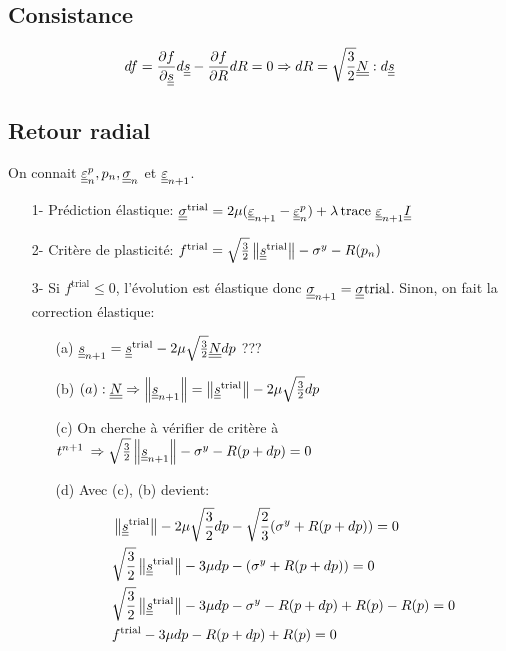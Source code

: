 \documentclass[11pt]{article}
\begin{document}
\subsection{Consistance}

\begin{equation}
  \label{eq:2}
  df = \frac{\partial f}{\partial {\underline{\underline{s}}}} d{\underline{\underline{s}}} - \frac{\partial f}{\partial R}dR = 0 \Rightarrow dR = \sqrt{\frac{3}{2}}{\underline{\underline{N}}}:d{\underline{\underline{s}}}
\end{equation}


\subsection{Retour radial}

On connait ${\underline{\underline{\varepsilon}}}^p_{n},p_n,{\underline{\underline{\sigma}}}_n$ et ${\underline{\underline{\varepsilon}}}_{n+1}$.
\begin{itemize}
\item[1-] Prédiction élastique: ${\underline{\underline{\sigma}}}^{\text{trial}}=2\mu ({\underline{\underline{\varepsilon}}}_{n+1}-{\underline{\underline{\varepsilon}}}^p_{n}) + \lambda \operatorname{trace \,}{{\underline{\underline{\varepsilon}}}_{n+1}}{\underline{\underline{I}}} $
\item[2-] Critère de plasticité: $f^{\text{trial}} = \sqrt{\frac{3}{2}}\left\Vert{\underline{\underline{s}}}^{\text{trial}}\right\Vert - \sigma^y - R(p_n)$
\item[3-] Si $f^{\text{trial}}\leq 0$, l'évolution est élastique donc ${\underline{\underline{\sigma}}}_{n+1}={\underline{\underline{\sigma}}}{\text{trial}}$. Sinon, on fait la correction élastique:
  \begin{itemize}
  \item[(a)] ${\underline{\underline{s}}}_{n+1}={\underline{\underline{s}}}^{\text{trial}} - 2\mu \sqrt{\frac{3}{2}} {\underline{\underline{N}}} dp$ ???
  \item[(b)] $(a):{\underline{\underline{N}}} \Rightarrow \left\Vert{\underline{\underline{s}}}_{n+1}\right\Vert=\left\Vert{\underline{\underline{s}}}^{\text{trial}}\right\Vert - 2\mu \sqrt{\frac{3}{2}} dp$ 
  \item[(c)] On cherche à vérifier de critère à $t^{n+1} \: \Rightarrow \sqrt{\frac{3}{2}}\left\Vert{\underline{\underline{s}}}_{n+1}\right\Vert - \sigma^y -R(p+dp) = 0 $
  \item[(d)] Avec (c), (b) devient:
    \begin{align}
      & \norm{\tens{s}^{\text{trial}}} - 2\mu \sqrt{\frac{3}{2}} dp - \sqrt{\frac{2}{3}}(\sigma^y  + R(p+dp)) =0 \\
      & \sqrt{\frac{3}{2}} \norm{\tens{s}^{\text{trial}}} - 3\mu  dp - (\sigma^y  + R(p+dp)) =0 \\
      & \sqrt{\frac{3}{2}} \norm{\tens{s}^{\text{trial}}} - 3\mu  dp - \sigma^y  - R(p+dp) +R(p) -R(p) =0 \\
      & f^{\text{trial}}  - 3\mu  dp   - R(p+dp) +R(p) =0 \\

\end{align}
\end{itemize}
\end{itemize}
\end{document}
